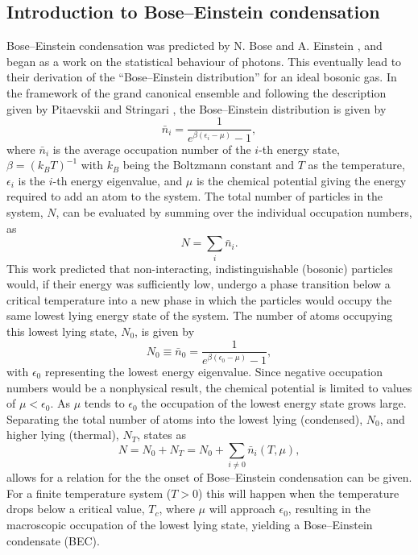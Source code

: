 \subsection{Introduction to Bose--Einstein condensation}\label{sub:becintro}
Bose--Einstein condensation was predicted by N. Bose and A. Einstein \cite{BEC:Ketterle_revmod_2002}, and began as a work on the statistical behaviour of photons. This eventually lead to their derivation of the ``Bose--Einstein distribution'' for an ideal bosonic gas. In the framework of the grand canonical ensemble and following the description given by Pitaevskii and Stringari \cite[chap. 2]{BK:Pitaevskii_Stringari_2003}, the Bose--Einstein distribution is given by
\begin{equation}
\bar{n}_i = \frac{1}{e^{\beta(\epsilon_i - \mu)} -1},
\end{equation}
where $\bar{n}_i$ is the average occupation number of the $i$-th energy state, $\beta=(k_BT)^{-1}$ with $k_B$ being the Boltzmann constant and $T$ as the temperature, $\epsilon_i$ is the $i$-th energy eigenvalue, and $\mu$ is the chemical potential giving the energy required to add an atom to the system.
The total number of particles in the system, $N$, can be evaluated by summing over the individual occupation numbers, as
\begin{equation}
N=\displaystyle\sum_i \bar{n}_i.
\end{equation}
This work predicted that non-interacting, indistinguishable (bosonic) particles would, if their energy was sufficiently low, undergo a phase transition below a critical temperature into a new phase in which the particles would occupy the same lowest lying energy state of the system. The number of atoms occupying this lowest lying state, $N_0$, is given by
\begin{equation}
N_0 \equiv \bar{n}_0 = \frac{1}{e^{\beta(\epsilon_0 - \mu)} - 1},
\end{equation}
with $\epsilon_0$ representing the lowest energy eigenvalue. Since negative occupation numbers would be a nonphysical result, the chemical potential is limited to values of $\mu < \epsilon_0$. As $\mu$ tends to $\epsilon_0$ the occupation of the lowest energy state grows large. Separating the total number of atoms into the lowest lying (condensed), $N_0$, and higher lying (thermal), $N_T$, states as
\begin{equation}
N = N_0 + N_T = N_0 + \displaystyle\sum_{i\neq 0}\bar{n}_i(T,\mu),
\end{equation}
allows for a relation for the the onset of Bose--Einstein condensation can be given. For a finite temperature system ($T>0$) this will happen when the temperature drops below a critical value, $T_c$, where $\mu$ will approach $\epsilon_0$, resulting in the macroscopic occupation of the lowest lying state, yielding a Bose--Einstein condensate (BEC).

